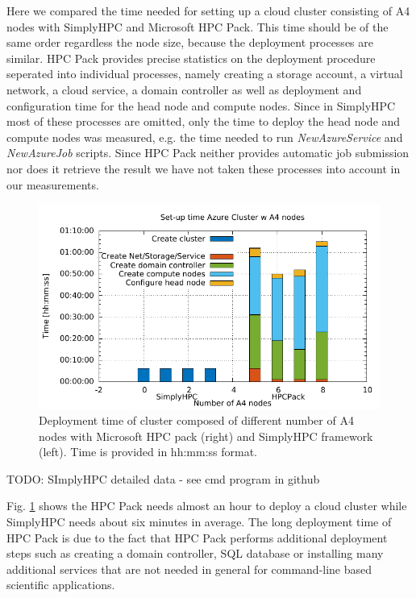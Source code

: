 \documentclass[3p,times]{elsarticle}
\begin{document}
Here we compared the time needed for setting up a cloud cluster consisting of A4 nodes with SimplyHPC and Microsoft HPC Pack. This time should be of the same order regardless the node size, because the deployment processes are similar. HPC Pack provides precise statistics on the deployment procedure seperated into individual processes, namely creating a storage account, a virtual network, a cloud service, a domain controller as well as deployment and configuration time for the head node and compute nodes. Since in SimplyHPC most of these processes are omitted, only the time to deploy the head node and compute nodes was measured, e.g. the time needed to run \textit{NewAzureService} and \textit{NewAzureJob} scripts. Since HPC Pack neither provides automatic job submission nor does it retrieve the result we have not taken these processes into account in our measurements. 


\begin{figure}[h]
\centering
	\includegraphics[width=.6\linewidth]{gplt-creation-simplyvshpc}
	\caption{Deployment time of cluster composed of different number of A4 nodes with Microsoft HPC pack (right) and SimplyHPC framework (left). Time is provided in hh:mm:ss format.}
	\label{fig:deployTime}
\end{figure}

\textcolor[rgb]{1,0,0}{TODO: SImplyHPC detailed data -  see cmd program in github}

Fig. \ref{fig:deployTime} shows the HPC Pack needs almost an hour to deploy a cloud cluster while SimplyHPC needs about six minutes in average. The long deployment time of HPC Pack is due to the fact that HPC Pack performs additional deployment steps such as creating a domain controller, SQL database or installing many additional services that are not needed in general for command-line based scientific applications.
\end{document}

